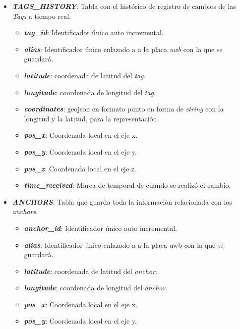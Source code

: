 \begin{itemize}
\begin{itemize}
            \end{itemize}
    \item \textit{\textbf{TAGS\_HISTORY}}: Tabla con el histórico de registro de cambios de las \textit{Tags} a tiempo real.
            \begin{itemize}
                \item \textit{\textbf{tag\_id}}: Identificador único auto incremental.
                \item \textit{\textbf{alias}}: Identificador único enlazado a a la placa \textit{uwb} con la que se guardará.
                \item \textit{\textbf{latitude}}: coordenada de latitud del \textit{tag}.
                \item \textit{\textbf{longitude}}: coordenada de longitud del \textit{tag}.
                \item \textit{\textbf{coordinates}}: geojson en formato punto en forma de \textit{string} con la longitud y la latitud, para la representación.
                \item \textit{\textbf{pos\_x}}: Coordenada local en el eje x.
                \item \textit{\textbf{pos\_y}}: Coordenada local en el eje y.
                \item \textit{\textbf{pos\_z}}: Coordenada local en el eje z.
                \item \textit{\textbf{time\_received}}: Marca de temporal de cuando se realizó el cambio.
            \end{itemize}
    \item \textit{\textbf{ANCHORS}}: Tabla que guarda toda la información relacionada con los \textit{anchors}.
            \begin{itemize}
                \item \textit{\textbf{anchor\_id}}: Identificador único auto incremental.
                \item \textit{\textbf{alias}}: Identificador único enlazado a a la placa uwb con la que se guardará.
                \item \textit{\textbf{latitude}}: coordenada de latitud del \textit{anchor}.
                \item \textit{\textbf{longitude}}: coordenada de longitud del \textit{anchor}.
                \item \textit{\textbf{pos\_x}}: Coordenada local en el eje x.
                \item \textit{\textbf{pos\_y}}: Coordenada local en el eje y.

\end{itemize}
\end{itemize}
